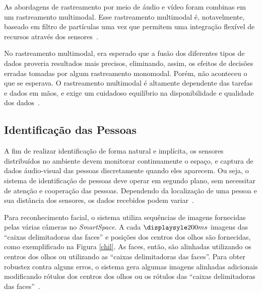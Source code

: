 As abordagens de rastreamento por meio de áudio e vídeo foram combinas em um rastreamento multimodal. Esse rastreamento multimodal é, notavelmente, baseado em filtro de partículas uma vez que permitem uma integração flexível de recursos através dos sensores~\cite{chil}.

No rastreamento multimodal, era esperado que a fusão dos diferentes tipos de dados proveria resultados mais precisos, eliminando, assim, os efeitos de decisões erradas tomadas por algum rastreamento monomodal. Porém, não aconteceu o que se esperava. O rastreamento multimodal é altamente dependente das tarefas e dados em mãos, e exige um cuidadoso equilíbrio na disponibilidade e qualidade dos dados~\cite{chil}.

\subsection{Identificação das Pessoas}


A fim de realizar identificação de forma natural e implícita, os sensores distribuídos no ambiente devem monitorar continuamente o espaço, e captura de dados áudio-visual das pessoas discretamente quando eles aparecem. Ou seja, o sistema de identificação de pessoas
deve operar em segundo plano, sem necessitar de atenção e cooperação das pessoas. Dependendo da localização de uma pessoa e sua distância dos sensores, os dados recebidos podem variar~\cite{chil}. 

Para reconhecimento facial, o sistema utiliza sequências de imagens fornecidas pelas várias câmeras no \textit{SmartSpace}. A cada $\displaysyle 200ms$ imagens das ``caixas delimitadoras das faces'' e posições dos centros dos olhos são fornecidas, como exemplificado na Figura \ref{chil}. As faces, então, são alinhadas utilizando os centros dos olhos ou utilizando as ``caixas delimitadoras das faces''. Para obter robustez contra alguns erros, o sistema gera algumas imagens alinhadas adicionais modificando rótulos dos centros dos olhos ou os rótulos das ``caixas delimitadoras das faces''~\cite{chil}.

